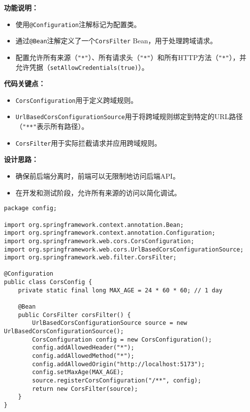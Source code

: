 \documentclass{ctexart}
\begin{document}
\textbf{功能说明：}
\begin{itemize}
    \item 使用\texttt{@Configuration}注解标记为配置类。
    \item 通过\texttt{@Bean}注解定义了一个\texttt{CorsFilter} Bean，用于处理跨域请求。
    \item 配置允许所有来源（\texttt{"*"}）、所有请求头（\texttt{"*"}）和所有HTTP方法（\texttt{"*"}），并允许凭据（\texttt{setAllowCredentials(true)}）。
\end{itemize}

\textbf{代码关键点：}
\begin{itemize}
    \item \texttt{CorsConfiguration}用于定义跨域规则。
    \item \texttt{UrlBasedCorsConfigurationSource}用于将跨域规则绑定到特定的URL路径（\texttt{"**"}表示所有路径）。
    \item \texttt{CorsFilter}用于实际拦截请求并应用跨域规则。
\end{itemize}

\textbf{设计思路：}
\begin{itemize}
    \item 确保前后端分离时，前端可以无限制地访问后端API。
    \item 在开发和测试阶段，允许所有来源的访问以简化调试。
\end{itemize}

\begin{lstlisting}[caption=\texttt{config/CorsConfig.java}]
package config;

import org.springframework.context.annotation.Bean;
import org.springframework.context.annotation.Configuration;
import org.springframework.web.cors.CorsConfiguration;
import org.springframework.web.cors.UrlBasedCorsConfigurationSource;
import org.springframework.web.filter.CorsFilter;

@Configuration
public class CorsConfig {
    private static final long MAX_AGE = 24 * 60 * 60; // 1 day

    @Bean
    public CorsFilter corsFilter() {
        UrlBasedCorsConfigurationSource source = new UrlBasedCorsConfigurationSource();
        CorsConfiguration config = new CorsConfiguration();
        config.addAllowedHeader("*");
        config.addAllowedMethod("*");
        config.addAllowedOrigin("http://localhost:5173");
        config.setMaxAge(MAX_AGE);
        source.registerCorsConfiguration("/**", config);
        return new CorsFilter(source);
    }
}

\end{lstlisting}
\end{document}
